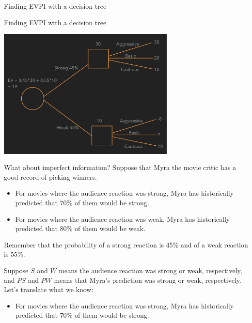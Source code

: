 \documentclass{beamer}\usepackage[]{graphicx}\usepackage[]{color}
\begin{document}
\begin{darkframes}
\begin{frame}[fragile]{Finding EVPI with a decision tree}
    \end{frame}


    \begin{frame}[fragile]{Finding EVPI with a decision tree}
      \fontsize{10}{10}\selectfont

        \begin{center}
        \includegraphics[width=3.5in]{BevoPerfectInfo} 
        \end{center}
    
    \lc %
    \end{frame}  


    \begin{frame}[fragile]{What about imperfect information?}
      Suppose that Myra the movie critic has a good record of picking winners.
      \begin{itemize}
        \item For movies where the audience reaction was strong, Myra has historically predicted that 70\% of them would be strong.
        \item For movies where the audience reaction was weak, Myra has historically predicted that 80\% of them would be weak.
      \end{itemize}

      Remember that the probability of a strong reaction is 45\% and of a weak reaction is 55\%.

      \lc %
    \end{frame}

    \begin{frame}
      Suppose $S$ and $W$ means the audience reaction was strong or weak, respectively, and $PS$ and $PW$ means that Myra's prediction was strong or weak, respectively. Let's translate what we know:
      \pause
      \begin{itemize}
        \item For movies where the audience reaction was strong, Myra has historically predicted that 70\% of them would be strong.\pause


\end{itemize}
\end{frame}
\end{darkframes}
\end{document}
